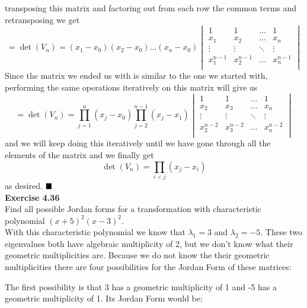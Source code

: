 \documentclass[letterpaper,12pt]{article}
\theoremstyle{definition}
\begin{document}
   transposing this matrix and factoring out from each row the common terms and retransposing we get
   \[=\det(V_n)=(x_{1}-x_{0})(x_2-x_0)\hdots(x_n-x_0)
   \begin{vmatrix}
   1& 1 &\hdots&1\\
   x_1& x_2&\hdots& x_n\\
   \vdots&\vdots &\ddots&\vdots\\
  x_1^{n-1}& x_2^{n-1}&\hdots&x_n^{n-1}\\
   \end{vmatrix} \]
   Since the matrix we ended us with is similar to the one we started with, performing the same operations iteratively on this matrix  will give us
   \[=\det(V_n)=\prod _{j=1}^n(x_j-x_0)\prod _{j=2}^{n-1}(x_j-x_1)\begin{vmatrix}
   1& 1 &\hdots&1\\
   x_2& x_3&\hdots& x_n\\
   \vdots&\vdots &\ddots&\vdots\\
  x_2^{n-2}& x_3^{n-2}&\hdots&x_n^{n-2}\\
   \end{vmatrix}\]
and we will keep doing this iteratively until we have gone through all the elements of the matrix and we finally get
\[\det (V_n)=\prod _{i<j}(x_j-x_i)\]
as desired.
$\hfill \blacksquare$\\

\textbf{Exercise 4.36}\\
\indent Find all possible Jordan forms for a transformation with characteristic polynomial $(x+5)^2(x-3)^2$.\\
\indent With this characteristic polynomial we know that $\lambda_1 = 3$ and $\lambda_2=-5$. These two eigenvalues both have algebraic multiplicity of 2, but we don't know what their geometric multiplicities are. Because we do not know the their geometric multiplicities there are four possibilities for the Jordan Form of these matrices:

The first possibility is that 3 has a geometric multiplicity of 1 and -5 has a geometric multiplicity of 1. Its Jordan Form would be:
\end{document}

